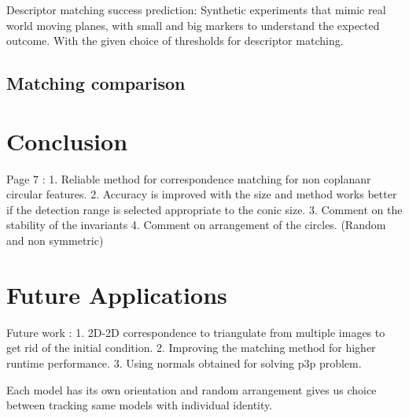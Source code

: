 \documentclass{bmvc2k}
\begin{document}
Descriptor matching success prediction: Synthetic experiments that mimic real world moving planes, with small and big markers to understand the expected outcome. With the given choice of thresholds for descriptor matching. 

\subsection{Matching comparison}
%
%
%
%
%
%
%
%

\section{Conclusion}
Page 7 : 
1. Reliable method for correspondence matching for non coplananr circular features. 
2. Accuracy is improved with the size and method works better if the detection range is selected appropriate to the conic size. 
3. Comment on the stability of the invariants 
4. Comment on arrangement of the circles. (Random and non symmetric)


\section{Future Applications}
Future work : 
1. 2D-2D correspondence to triangulate from multiple images to get rid of the initial condition. 
2. Improving the matching method for higher runtime performance.
3. Using normals obtained for solving p3p problem. 

Each model has its own orientation and random arrangement gives us choice between tracking same models with individual identity. 



\end{document}
